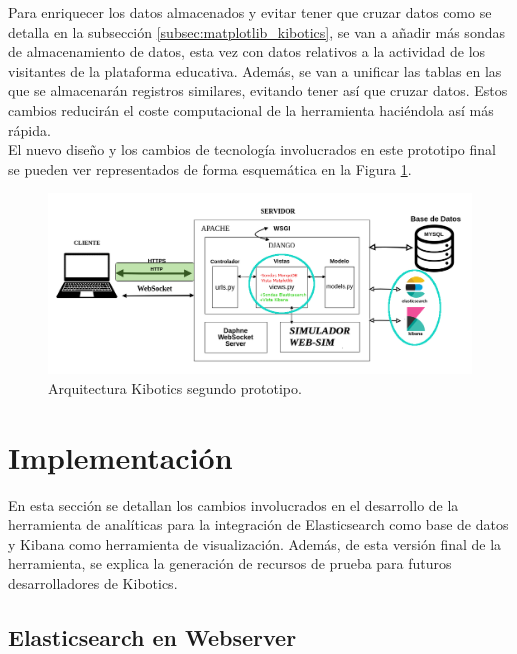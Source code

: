 \documentclass[a4paper, 12pt]{book}
\begin{document}
		Para enriquecer los datos almacenados y evitar tener que cruzar datos como se detalla en la subsección \ref{subsec:matplotlib_kibotics}, se van a añadir más sondas de almacenamiento de datos, esta vez con datos relativos a la actividad de los visitantes de la plataforma educativa. Además, se van a unificar las tablas en las que se almacenarán registros similares, evitando tener así que cruzar datos. Estos cambios reducirán el coste computacional de la herramienta haciéndola así más rápida. \\
		
		El nuevo diseño y los cambios de tecnología involucrados en este prototipo final se pueden ver representados de forma esquemática en la Figura \ref{fig:arquitectura_kibotics_2}. 
		
		\begin{figure}[H]
			\centering
			\includegraphics[width=16cm, keepaspectratio]{img/esquema_Kibotics_2.png}
			\caption{Arquitectura Kibotics segundo prototipo.}
			\label{fig:arquitectura_kibotics_2}
		\end{figure}
	
	\section{Implementación} 
	\label{sec:2_implementacion} 
	
		En esta sección se detallan los cambios involucrados en el desarrollo de la herramienta de analíticas para la integración de Elasticsearch como base de datos y Kibana como herramienta de visualización. Además, de esta versión final de la herramienta, se explica la generación de recursos de prueba para futuros desarrolladores de Kibotics.
	\subsection{Elasticsearch en Webserver}
	\label{subsec:elasticsearch_kibotics}
	
\end{document}

